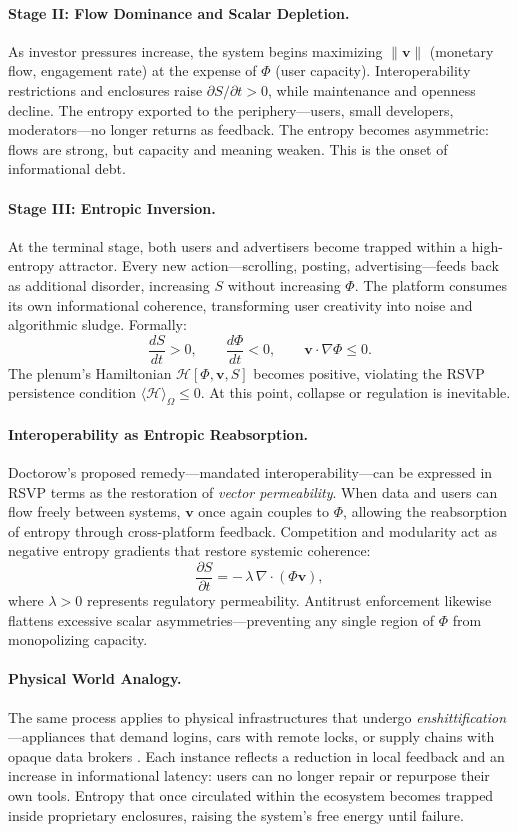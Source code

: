 \documentclass[12pt]{article}
\begin{document}
\paragraph{Stage II: Flow Dominance and Scalar Depletion.}
As investor pressures increase, the system begins maximizing $\|\mathbf{v}\|$ (monetary flow, engagement rate) at the expense of $\Phi$ (user capacity). Interoperability restrictions and enclosures raise $\partial S/\partial t>0$, while maintenance and openness decline. The entropy exported to the periphery—users, small developers, moderators—no longer returns as feedback. The entropy becomes asymmetric: flows are strong, but capacity and meaning weaken. This is the onset of informational debt.

\paragraph{Stage III: Entropic Inversion.}
At the terminal stage, both users and advertisers become trapped within a high-entropy attractor. Every new action—scrolling, posting, advertising—feeds back as additional disorder, increasing $S$ without increasing $\Phi$. The platform consumes its own informational coherence, transforming user creativity into noise and algorithmic sludge. Formally:
\[
\frac{dS}{dt} > 0,\qquad \frac{d\Phi}{dt} < 0,\qquad \mathbf{v}\cdot\nabla\Phi \le 0.
\]
The plenum’s Hamiltonian $\mathcal{H}[\Phi,\mathbf{v},S]$ becomes positive, violating the RSVP persistence condition $\langle \mathcal{H}\rangle_\Omega \le 0$. At this point, collapse or regulation is inevitable.

\paragraph{Interoperability as Entropic Reabsorption.}
Doctorow’s proposed remedy—mandated interoperability—can be expressed in RSVP terms as the restoration of \emph{vector permeability}. When data and users can flow freely between systems, $\mathbf{v}$ once again couples to $\Phi$, allowing the reabsorption of entropy through cross-platform feedback. Competition and modularity act as negative entropy gradients that restore systemic coherence:
\[
\frac{\partial S}{\partial t} = -\,\lambda\,\nabla\!\cdot(\Phi\mathbf{v}),
\]
where $\lambda>0$ represents regulatory permeability. Antitrust enforcement likewise flattens excessive scalar asymmetries—preventing any single region of $\Phi$ from monopolizing capacity.

\paragraph{Physical World Analogy.}
The same process applies to physical infrastructures that undergo \emph{enshittification}—appliances that demand logins, cars with remote locks, or supply chains with opaque data brokers \citep{doctorow2023enshittification}. Each instance reflects a reduction in local feedback and an increase in informational latency: users can no longer repair or repurpose their own tools. Entropy that once circulated within the ecosystem becomes trapped inside proprietary enclosures, raising the system’s free energy until failure.
\end{document}
